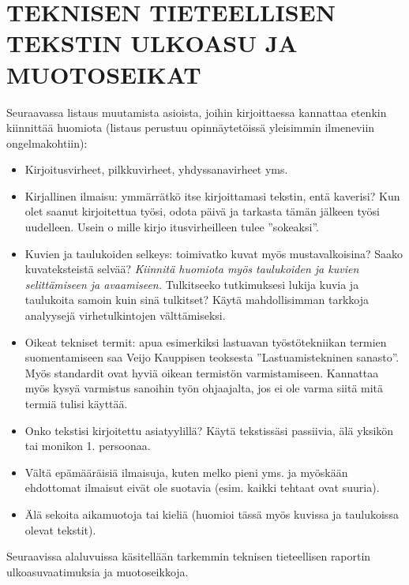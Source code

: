 \documentclass{LUT_pohja}[2016/03/09 LUT Dippa Pohja]
\begin{document}
\section{TEKNISEN TIETEELLISEN TEKSTIN ULKOASU JA MUOTOSEIKAT}

Seuraavassa listaus muutamista asioista, joihin kirjoittaessa kannattaa etenkin kiinnittää huomiota (listaus perustuu opinnäytetöissä yleisimmin ilmeneviin ongelmakohtiin): 
\begin{itemize}
\item Kirjoitusvirheet, pilkkuvirheet, yhdyssanavirheet yms.
\item Kirjallinen ilmaisu: ymmärrätkö itse kirjoittamasi tekstin, entä kaverisi? Kun olet saanut kirjoitettua työsi, odota päivä ja tarkasta tämän jälkeen työsi uudelleen. Usein o mille kirjo itusvirheilleen tulee ”sokeaksi”. 
\item Kuvien ja taulukoiden selkeys: toimivatko kuvat myös mustavalkoisina? Saako 
kuvateksteistä selvää? \textit{Kiinnitä huomiota myös taulukoiden ja kuvien selittämiseen 
ja avaamiseen.} Tulkitseeko tutkimuksesi lukija kuvia ja taulukoita samoin kuin sinä 
tulkitset?  Käytä  mahdollisimman  tarkkoja  analyysejä  virhetulkintojen 
välttämiseksi.
\item Oikeat  tekniset  termit: apua esimerkiksi  lastuavan työstötekniikan termien 
suomentamiseen  saa Veijo  Kauppisen \citeyearpar{Kauppinen90} teoksesta ”Lastuamistekninen sanasto”. Myös standardit ovat hyviä oikean termistön varmistamiseen. Kannattaa myös kysyä varmistus sanoihin työn ohjaajalta, jos ei ole varma siitä mitä termiä tulisi käyttää.
\item Onko tekstisi kirjoitettu asiatyylillä? Käytä tekstissäsi passiivia, älä yksikön tai monikon 1. persoonaa. 
\item Vältä epämääräisiä ilmaisuja, kuten melko pieni yms. ja myöskään ehdottomat 
ilmaisut eivät ole suotavia (esim. kaikki tehtaat ovat suuria).
\item Älä sekoita aikamuotoja tai kieliä (huomioi tässä myös kuvissa ja taulukoissa 
olevat tekstit).
\end{itemize}
Seuraavissa  alaluvuissa  käsitellään  tarkemmin  teknisen  tieteellisen  raportin 
ulkoasuvaatimuksia ja muotoseikkoja.
\end{document}
